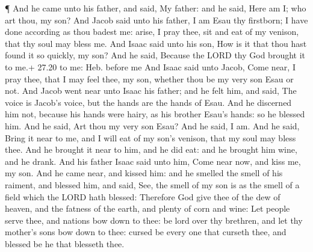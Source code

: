  ¶ And he came unto his father, and said, My father: and he
said, Here am I; who art thou, my son?  And Jacob said unto
his father, I am Esau thy firstborn; I have done according as thou
badest me: arise, I pray thee, sit and eat of my venison, that thy soul
may bless me.  And Isaac said unto his son, How is it that
thou hast found it so quickly, my son? And he said, Because the LORD thy
God brought it to me.+ 27.20 to me: Heb. before me  And
Isaac said unto Jacob, Come near, I pray thee, that I may feel thee, my
son, whether thou be my very son Esau or not.  And Jacob
went near unto Isaac his father; and he felt him, and said, The voice is
Jacob's voice, but the hands are the hands of Esau.  And he
discerned him not, because his hands were hairy, as his brother Esau's
hands: so he blessed him.  And he said, Art thou my very
son Esau? And he said, I am.  And he said, Bring it near to
me, and I will eat of my son's venison, that my soul may bless thee. And
he brought it near to him, and he did eat: and he brought him wine, and
he drank.  And his father Isaac said unto him, Come near
now, and kiss me, my son.  And he came near, and kissed
him: and he smelled the smell of his raiment, and blessed him, and said,
See, the smell of my son is as the smell of a field which the LORD hath
blessed:  Therefore God give thee of the dew of heaven, and
the fatness of the earth, and plenty of corn and wine:  Let
people serve thee, and nations bow down to thee: be lord over thy
brethren, and let thy mother's sons bow down to thee: cursed be every
one that curseth thee, and blessed be he that blesseth thee.

